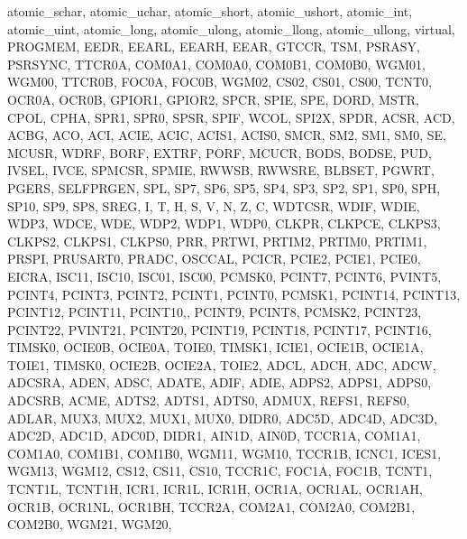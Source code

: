 {{                atomic_schar, atomic_uchar, atomic_short, atomic_ushort, atomic_int, 
                atomic_uint, atomic_long, atomic_ulong, atomic_llong, atomic_ullong, 
                virtual, PROGMEM,
                EEDR, EEARL, EEARH, EEAR,
                GTCCR, TSM, PSRASY, PSRSYNC,
                TTCR0A, COM0A1, COM0A0, COM0B1, COM0B0, WGM01, WGM00,
                TTCR0B, FOC0A, FOC0B, WGM02, CS02, CS01, CS00,
                TCNT0, OCR0A, OCR0B,
                GPIOR1, GPIOR2,
                SPCR, SPIE, SPE, DORD, MSTR, CPOL, CPHA, SPR1, SPR0,
                SPSR, SPIF, WCOL, SPI2X,
                SPDR,
                ACSR, ACD, ACBG, ACO, ACI, ACIE, ACIC, ACIS1, ACIS0,
                SMCR, SM2, SM1, SM0, SE,
                MCUSR, WDRF, BORF, EXTRF, PORF,
                MCUCR, BODS, BODSE, PUD, IVSEL, IVCE,
                SPMCSR, SPMIE, RWWSB, RWWSRE, BLBSET, PGWRT, PGERS, SELFPRGEN,
                SPL, SP7, SP6, SP5, SP4, SP3, SP2, SP1, SP0, 
                SPH, SP10, SP9, SP8,
                SREG, I, T, H, S, V, N, Z, C,
                WDTCSR, WDIF, WDIE, WDP3, WDCE, WDE, WDP2, WDP1, WDP0,
                CLKPR, CLKPCE, CLKPS3, CLKPS2, CLKPS1, CLKPS0,
                PRR, PRTWI, PRTIM2, PRTIM0, PRTIM1, PRSPI, PRUSART0, PRADC,
                OSCCAL,
                PCICR, PCIE2, PCIE1, PCIE0,
                EICRA, ISC11, ISC10, ISC01, ISC00,
                PCMSK0, PCINT7, PCINT6, PVINT5, PCINT4, PCINT3, PCINT2, PCINT1, PCINT0,
                PCMSK1, PCINT14, PCINT13, PCINT12, PCINT11, PCINT10,, PCINT9, PCINT8,
                PCMSK2, PCINT23, PCINT22, PVINT21, PCINT20, PCINT19, PCINT18, PCINT17, PCINT16,
                TIMSK0, OCIE0B, OCIE0A, TOIE0,
                TIMSK1, ICIE1, OCIE1B, OCIE1A, TOIE1,
                TIMSK0, OCIE2B, OCIE2A, TOIE2,
                ADCL, ADCH, ADC, ADCW,
                ADCSRA, ADEN, ADSC, ADATE, ADIF, ADIE, ADPS2, ADPS1, ADPS0,
                ADCSRB, ACME, ADTS2, ADTS1, ADTS0,
                ADMUX, REFS1, REFS0, ADLAR, MUX3, MUX2, MUX1, MUX0,
                DIDR0, ADC5D, ADC4D, ADC3D, ADC2D, ADC1D, ADC0D,
                DIDR1, AIN1D, AIN0D,
                TCCR1A, COM1A1, COM1A0, COM1B1, COM1B0, WGM11, WGM10,
                TCCR1B, ICNC1, ICES1, WGM13, WGM12, CS12, CS11, CS10,
                TCCR1C, FOC1A, FOC1B,
                TCNT1, TCNT1L, TCNT1H,
                ICR1, ICR1L, ICR1H,
                OCR1A, OCR1AL, OCR1AH,
                OCR1B, OCR1NL, OCR1BH,
                TCCR2A, COM2A1, COM2A0, COM2B1, COM2B0, WGM21, WGM20,
}}

